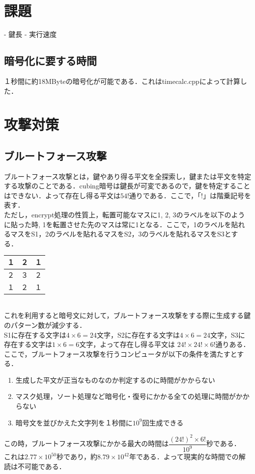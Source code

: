 \documentclass[titlepage]{jarticle}
\begin{document}
\section{課題}
- 鍵長
- 実行速度

\subsection{暗号化に要する時間}
１秒間に約18MByteの暗号化が可能である．これはtimecalc.cppによって計算した．

\section{攻撃対策}
\subsection{ブルートフォース攻撃}
ブルートフォース攻撃とは，鍵やあり得る平文を全探索し，鍵または平文を特定する攻撃のことである．cubing暗号は鍵長が可変であるので，鍵を特定することはできない．よって存在し得る平文は\(54!\)通りである．ここで，「\(!\)」は階乗記号を表す．\\
ただし，encrypt処理の性質上，転置可能なマスに1, 2, 3のラベルを以下のように貼った時, 1を転置させた先のマスは常に1となる．ここで，1のラベルを貼れるマスをS1，2のラベルを貼れるマスをS2，3のラベルを貼れるマスをS3とする．\\
\begin{table}[htb]
  \begin{tabular}{|l|c|r|} \hline
    １ & ２ & １ \\ \hline
    ２ & ３ & ２ \\ \hline
    １ & ２ & １ \\ \hline
  \end{tabular}
\end{table}\\
これを利用すると暗号文に対して，ブルートフォース攻撃をする際に生成する鍵のパターン数が減少する．\\
S1に存在する文字は\(4\times6=24\)文字，S2に存在する文字は\(4\times6=24\)文字，S3に存在する文字は\(1\times6=6\)文字，よって存在し得る平文は \(24!\times24!\times6!\)通りある．\\
ここで，ブルートフォース攻撃を行うコンピュータが以下の条件を満たすとする．
\begin{enumerate}
  \item 生成した平文が正当なものなのか判定するのに時間がかからない
  \item マスク処理，ソート処理など暗号化・復号にかかる全ての処理に時間がかからない
  \item 暗号文を並びかえた文字列を１秒間に\(10^9\)回生成できる
\end{enumerate}
この時，ブルートフォース攻撃にかかる最大の時間は\(\dfrac{(24!)^2\times6!}{10^9}\)秒である．\\
これは\(2.77\times10^{50}\)秒であり，約\(8.79\times10^{42}\)年である．よって現実的な時間での解読は不可能である．
\end{document}
